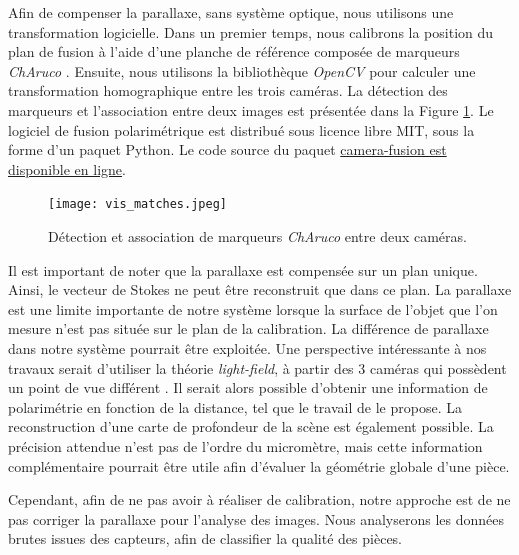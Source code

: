 Afin de compenser la parallaxe, sans système optique, nous utilisons une transformation logicielle.
Dans un premier temps, nous calibrons la position du plan de fusion à l'aide d'une planche de référence composée de marqueurs \textit{ChAruco} \cite{garrido-jurado_automatic_2014, garrido-jurado_generation_2016, romero-ramirez_speeded_2018}.
Ensuite, nous utilisons la bibliothèque \textit{OpenCV} \cite{opencv_library} pour calculer une transformation homographique entre les trois caméras.
La détection des marqueurs et l'association entre deux images est présentée dans la Figure \ref{fig:mecaruco}.
Le logiciel de fusion polarimétrique est distribué sous licence libre MIT, sous la forme d'un paquet Python.
Le code source du paquet \href{https://github.com/a1rb4Ck/camera-fusion}{camera-fusion est disponible en ligne}.

\begin{figure}[thb]
	\centering
	\texttt{[image: vis\_matches.jpeg]}
	\caption{Détection et association de marqueurs \textit{ChAruco} entre deux caméras.}
	\label{fig:mecaruco}
\end{figure}

Il est important de noter que la parallaxe est compensée sur un plan unique.
Ainsi, le vecteur de Stokes ne peut être reconstruit que dans ce plan.
La parallaxe est une limite importante de notre système lorsque la surface de l'objet que l'on mesure n'est pas située sur le plan de la calibration.
La différence de parallaxe dans notre système pourrait être exploitée.
Une perspective intéressante à nos travaux serait d'utiliser la théorie \textit{light-field}, à partir des 3 caméras qui possèdent un point de vue différent \cite{wilburn_high_2005}.
Il serait alors possible d'obtenir une information de polarimétrie en fonction de la distance, tel que le travail de \citeauthor{gendre_interest_2018} \cite{gendre_interest_2018} le propose.
La reconstruction d'une carte de profondeur de la scène est également possible.
La précision attendue n'est pas de l'ordre du micromètre, mais cette information complémentaire pourrait être utile afin d'évaluer la géométrie globale d'une pièce.

Cependant, afin de ne pas avoir à réaliser de calibration, notre approche est de ne pas corriger la parallaxe pour l'analyse des images. 
Nous analyserons les données brutes issues des capteurs, afin de classifier la qualité des pièces.

